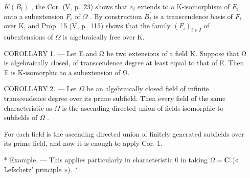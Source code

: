 \(K(B_{i})\) , the Cor. (V, p.~23) shows that \(v_{i}\) extends to a K-isomorphism of \(E_{i}\) onto a subextension \(F_{i}\) of \(\Omega\) . By construction \(B_{i}^{\prime}\) is a transcendence basis of \(F_{i}\) over K, and Prop. 15 (V, p.~115) shows that the family \((F_{i})_{i\in I}\) of subextensions of \(\Omega\) is algebraically free over K.

COROLLARY 1. --- Let E and Ω be two extensions of a field K. Suppose that Ω is algebraically closed, of transcendence degree at least equal to that of E. Then E is K-isomorphic to a subextension of Ω.

COROLLARY 2. --- Let \(\Omega\) be an algebraically closed field of infinite transcendence degree over its prime subfield. Then every field of the same characteristic as \(\Omega\) is the ascending directed union of fields isomorphic to subfields of \(\Omega\) .

For each field is the ascending directed union of finitely generated subfields over its prime field, and now it is enough to apply Cor. 1.

* Example. --- This applies particularly in characteristic 0 in taking \(\Omega = \mathbf{C}\) (« Lefschetz' principle »). *

